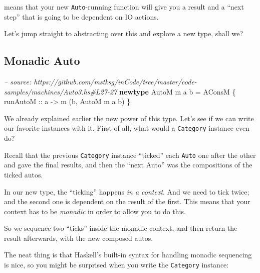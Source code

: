 \documentclass[]{article}
\newenvironment{Shaded}{}{}
\newcommand{\KeywordTok}[1]{\textcolor[rgb]{0.00,0.44,0.13}{\textbf{{#1}}}}
\newcommand{\DataTypeTok}[1]{\textcolor[rgb]{0.56,0.13,0.00}{{#1}}}
\newcommand{\CommentTok}[1]{\textcolor[rgb]{0.38,0.63,0.69}{\textit{{#1}}}}
\newcommand{\OtherTok}[1]{\textcolor[rgb]{0.00,0.44,0.13}{{#1}}}
\newcommand{\FunctionTok}[1]{\textcolor[rgb]{0.02,0.16,0.49}{{#1}}}
\newcommand{\NormalTok}[1]{{#1}}
\begin{document}
means that your new \texttt{Auto}-running function will give you a
result and a ``next step'' that is going to be dependent on IO actions.

Let's jump straight to abstracting over this and explore a new type,
shall we?

\subsection{Monadic Auto}\label{monadic-auto}

\begin{Shaded}
\begin{Highlighting}[]
\CommentTok{-- source: https://github.com/mstksg/inCode/tree/master/code-samples/machines/Auto3.hs#L27-27}
\KeywordTok{newtype} \DataTypeTok{AutoM} \NormalTok{m a b }\FunctionTok{=} \DataTypeTok{AConsM} \NormalTok{\{}\OtherTok{ runAutoM ::} \NormalTok{a }\OtherTok{->} \NormalTok{m (b, }\DataTypeTok{AutoM} \NormalTok{m a b) \}}
\end{Highlighting}
\end{Shaded}

We already explained earlier the new power of this type. Let's see if we
can write our favorite instances with it. First of all, what would a
\texttt{Category} instance even do?

Recall that the previous \texttt{Category} instance ``ticked'' each
\texttt{Auto} one after the other and gave the final results, and then
the ``next Auto'' was the compositions of the ticked autos.

In our new type, the ``ticking'' happens \emph{in a context}. And we
need to tick twice; and the second one is dependent on the result of the
first. This means that your context has to be \emph{monadic} in order to
allow you to do this.

So we sequence two ``ticks'' inside the monadic context, and then return
the result afterwards, with the new composed autos.

The neat thing is that Haskell's built-in syntax for handling monadic
sequencing is nice, so you might be surprised when you write the
\texttt{Category} instance:

\begin{Shaded}
\end{Shaded}
\end{document}
